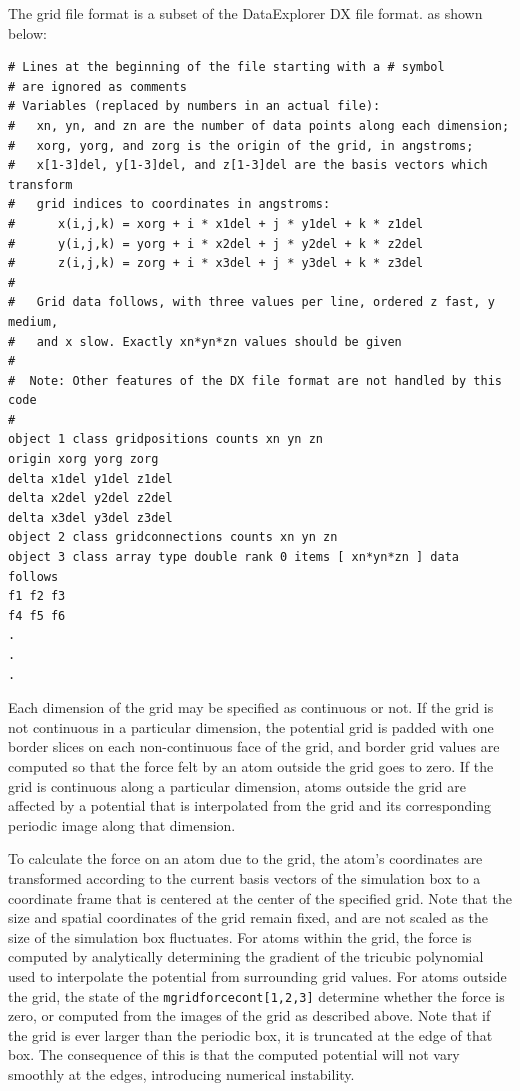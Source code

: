The grid file format is a subset of the DataExplorer DX file format. as shown below:
\begin{verbatim}
# Lines at the beginning of the file starting with a # symbol 
# are ignored as comments
# Variables (replaced by numbers in an actual file):
#   xn, yn, and zn are the number of data points along each dimension;
#   xorg, yorg, and zorg is the origin of the grid, in angstroms;
#   x[1-3]del, y[1-3]del, and z[1-3]del are the basis vectors which transform
#   grid indices to coordinates in angstroms:
#      x(i,j,k) = xorg + i * x1del + j * y1del + k * z1del
#      y(i,j,k) = yorg + i * x2del + j * y2del + k * z2del
#      z(i,j,k) = zorg + i * x3del + j * y3del + k * z3del
#
#   Grid data follows, with three values per line, ordered z fast, y medium,
#   and x slow. Exactly xn*yn*zn values should be given
#   
#  Note: Other features of the DX file format are not handled by this code
#
object 1 class gridpositions counts xn yn zn
origin xorg yorg zorg
delta x1del y1del z1del
delta x2del y2del z2del
delta x3del y3del z3del
object 2 class gridconnections counts xn yn zn
object 3 class array type double rank 0 items [ xn*yn*zn ] data follows
f1 f2 f3
f4 f5 f6
.
.
.
\end{verbatim}

Each dimension of the grid may be specified as continuous or not. If the grid is not continuous in a particular dimension, the potential grid is padded with one border slices on each non-continuous face of the grid, and border grid values are computed so that the force felt by an atom outside the grid goes to zero. If the grid is continuous along a particular dimension, atoms outside the grid are affected by a potential that is interpolated from the grid and its corresponding periodic image along that dimension.

To calculate the force on an atom due to the grid, the atom's coordinates are transformed according to the current basis vectors of the simulation box to a coordinate frame that is centered at the center of the specified grid. Note that the size and spatial coordinates of the grid remain fixed, and are not scaled as the size of the simulation box fluctuates. For atoms within the grid, the force is computed by analytically determining the gradient of the tricubic polynomial used to interpolate the potential from surrounding grid values. For atoms outside the grid, the state of the {\tt mgridforcecont[1,2,3]} determine whether the force is zero, or computed from the images of the grid as described above. Note that if the grid is ever larger than the periodic box, it is truncated at the edge of that box. The consequence of this is that the computed potential will not vary smoothly at the edges, introducing numerical instability.

